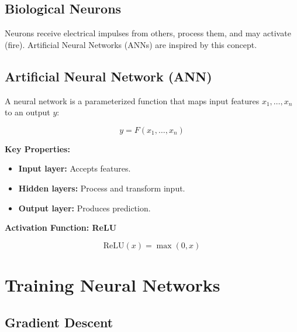 \subsection*{Biological Neurons}

Neurons receive electrical impulses from others, process them, and may activate (fire). Artificial Neural Networks (ANNs) are inspired by this concept.

\subsection*{Artificial Neural Network (ANN)}

A neural network is a parameterized function that maps input features $x_1, \ldots, x_n$ to an output $y$:

\[
y = F(x_1, \ldots, x_n)
\]

\textbf{Key Properties:}
\begin{itemize}
    \item \textbf{Input layer:} Accepts features.
    \item \textbf{Hidden layers:} Process and transform input.
    \item \textbf{Output layer:} Produces prediction.
\end{itemize}

\begin{center}
\end{center}

\textbf{Activation Function: ReLU}

\[
\text{ReLU}(x) = \max(0, x)
\]

\section{Training Neural Networks}

\subsection*{Gradient Descent}

